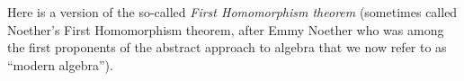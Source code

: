 Here is a version of the so-called \emph{First Homomorphism theorem}
(sometimes called Noether's First Homomorphism theorem, after Emmy
Noether who was among the first proponents of the abstract approach to
algebra that we now refer to as ``modern algebra'').
\ccpad
\begin{code}%
\>[0]\AgdaSpace{}%
\<%
\\
%
\\[\AgdaEmptyExtraSkip]%
\>[0]\AgdaSpace{}%
\AgdaModule{\AgdaUnderscore{}}%
\>[33I]\AgdaSymbol{\{}\AgdaSpace{}%
\AgdaSpace{}%
\AgdaSymbol{:}\AgdaSpace{}%
\AgdaSymbol{\}}\AgdaSpace{}%
\AgdaSymbol{\{}\AgdaSpace{}%
\AgdaSymbol{:}\AgdaSpace{}%
\AgdaSpace{}%
\AgdaSpace{}%
\AgdaSymbol{\}\{}\AgdaSpace{}%
\AgdaSymbol{:}\AgdaSpace{}%
\AgdaSpace{}%
\AgdaSpace{}%
\AgdaSymbol{\}\{}\AgdaSpace{}%
\AgdaSymbol{:}\AgdaSpace{}%
\AgdaSpace{}%
\AgdaSpace{}%
\AgdaSymbol{\}}\<%
\\
\>[.][@{}l@{}]\<[33I]%
\>[9]\<%
\\
%
\>[9]\AgdaSymbol{\{}\AgdaSpace{}%
\AgdaSymbol{:}\AgdaSpace{}%
\AgdaSpace{}%
\AgdaSpace{}%
\AgdaSpace{}%
\AgdaSpace{}%
\AgdaSymbol{\}}\<%
\\
%
\>[9]\AgdaSymbol{\{}\AgdaSpace{}%
\AgdaSymbol{:}\AgdaSpace{}%
\AgdaSpace{}%
\AgdaSpace{}%
\AgdaSpace{}%
\AgdaSymbol{\}}\<%
\\
%
\>[9]\AgdaSymbol{\{}\AgdaSpace{}%
\AgdaSymbol{:}\AgdaSpace{}%
\AgdaSpace{}%
\AgdaSpace{}%
\AgdaSpace{}%
\AgdaSpace{}%
\AgdaSpace{}%
\AgdaSymbol{(}\AgdaSpace{}%
\AgdaSpace{}%
\AgdaSpace{}%
\AgdaSpace{}%
\AgdaSpace{}%
\AgdaSpace{}%
\AgdaSymbol{)\}}\<%
\\
%
\>[9]\AgdaSymbol{\{}\AgdaSpace{}%
\AgdaSymbol{:}\AgdaSpace{}%
\AgdaSpace{}%
\AgdaSpace{}%
\AgdaSpace{}%

\end{code}
